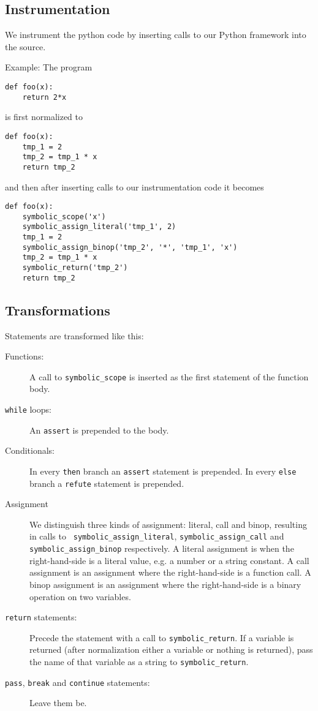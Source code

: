 \documentclass[11pt]{report}
\begin{document}
\begin{description}

\chapter{Instrumentation}
\label{ch:instrumentation}

We instrument the python code by inserting calls to our Python
framework into the source.

Example: The program
\begin{verbatim}
def foo(x):
    return 2*x
\end{verbatim}
is first normalized to
\begin{verbatim}
def foo(x):
    tmp_1 = 2
    tmp_2 = tmp_1 * x
    return tmp_2
\end{verbatim}
and then after inserting calls to our instrumentation code it becomes
\begin{verbatim}
def foo(x):
    symbolic_scope('x')
    symbolic_assign_literal('tmp_1', 2)
    tmp_1 = 2
    symbolic_assign_binop('tmp_2', '*', 'tmp_1', 'x')
    tmp_2 = tmp_1 * x
    symbolic_return('tmp_2')
    return tmp_2
\end{verbatim}

\section{Transformations}
Statements are transformed like this:

\begin{description}
  \item[Functions:] A call to {\tt symbolic\_scope} is inserted as the
    first statement of the function body.
  \item[{\tt while} loops:] An {\tt assert} is prepended to the body.
  \item[Conditionals:] In every {\tt then} branch an {\tt assert}
    statement is prepended. In every {\tt else} branch a {\tt refute}
    statement is prepended.
  \item[Assignment] We distinguish three kinds of assignment: literal,
    call and binop, resulting in calls to {\tt
      symbolic\_assign\_literal}, {\tt symbolic\_assign\_call} and
    {\tt symbolic\_assign\_binop} respectively. A literal assignment
    is when the right-hand-side is a literal value, e.g. a number or a
    string constant. A call assignment is an assignment where the
    right-hand-side is a function call. A binop assignment is an
    assignment where the right-hand-side is a binary operation on two
    variables.
  \item[{\tt return} statements:] Precede the statement with a call to
    {\tt symbolic\_return}. If a variable is returned (after
    normalization either a variable or nothing is returned), pass the
    name of that variable as a string to {\tt symbolic\_return}.
  \item[{\tt pass}, {\tt break} and {\tt continue} statements:] Leave
    them be.
\end{description}


\end{description}
\end{document}
